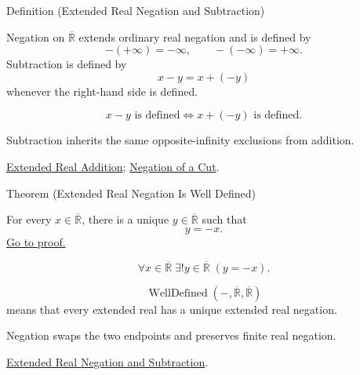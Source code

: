 \begin{definitionbox}{Definition (Extended Real Negation and Subtraction)}
\begin{definition}
\label{def:extended-real-negation}
Negation on $\overline{\mathbb{R}}$ extends ordinary real negation and is
defined by
\[
-(+\infty)=-\infty,\qquad -(-\infty)=+\infty.
\]
Subtraction is defined by
\[
x-y=x+(-y)
\]
whenever the right-hand side is defined.
\end{definition}
\end{definitionbox}
\begin{remark*}
\[
x-y\text{ is defined}\Longleftrightarrow x+(-y)\text{ is defined}.
\]
\end{remark*}
\begin{remark*}[Interpretation]
Subtraction inherits the same opposite-infinity exclusions from addition.
\end{remark*}
\begin{dependencies}
\hyperref[def:extended-real-addition]{Extended Real Addition};
\hyperref[def:negation-on-r]{Negation of a Cut}.
\end{dependencies}

\begin{theorembox}{Theorem (Extended Real Negation Is Well Defined)}
\begin{theorem}
\label{thm:extended-real-negation-well-defined}
For every $x\in\overline{\mathbb{R}}$, there is a unique
$y\in\overline{\mathbb{R}}$ such that
\[
y=-x.
\]
\hyperref[prf:extended-real-negation-well-defined]{Go to proof.}
\end{theorem}
\end{theorembox}
\begin{remark*}
\[
\forall x\in\overline{\mathbb{R}}\;\exists!y\in\overline{\mathbb{R}}\;(y=-x).
\]
\end{remark*}
\begin{remark*}
\[
\operatorname{WellDefined}(-,\overline{\mathbb{R}},\overline{\mathbb{R}})
\]
means that every extended real has a unique extended real negation.
\end{remark*}
\begin{remark*}[Interpretation]
Negation swaps the two endpoints and preserves finite real negation.
\end{remark*}
\begin{dependencies}
\hyperref[def:extended-real-negation]{Extended Real Negation and Subtraction}.
\end{dependencies}

